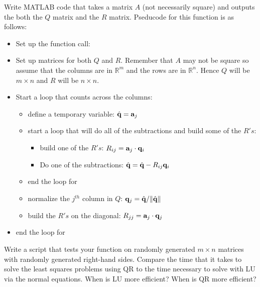\begin{problem}
    Write MATLAB code that takes a matrix $A$ (not necessarily square) and outputs the
    both the $Q$ matrix and the $R$ matrix. Pseducode for this function is as follows:
    \begin{itemize}
        \item Set up the function call:\\ 
        \item Set up  matrices for both $Q$ and $R$.  Remember that $A$ may
            not be square so assume that the columns are in $\mathbb{R}^m$ and the rows
            are in $\mathbb{R}^n$.  Hence $Q$ will be $m \times n$ and $R$ will be $n
            \times n$.
        \item Start a loop that counts across the columns:\\ 
            \begin{itemize}
                \item define a temporary variable: $\hat{{\bf q}} = {\bf a}_j$
                \item start a loop that will do all of the subtractions and build some of
                    the $R's$:\\ 
                    \begin{itemize}
                        \item build one of the $R's$: $R_{ij} = {\bf a}_j \cdot {\bf q}_i$
                        \item Do one of the subtractions: $\hat{{\bf q}} = \hat{{\bf q}} - R_{ij} {\bf q}_i$
                    \end{itemize}
                \item end the loop for 
                \item normalize the $j^{th}$ column in $Q$: ${\bf q}_j = \hat{{\bf q}} / \| \hat{{\bf q}} \|$
                \item build the $R's$ on the diagonal: $R_{jj} = {\bf a}_j \cdot {\bf q}_j$
            \end{itemize}
        \item end the loop for 
    \end{itemize}
\end{problem}

\begin{problem}
    Write a script that tests your  function on randomly generated $m×n$ matrices
    with randomly generated right-hand sides. Compare the time that it takes to solve the
    least squares problems using QR to the time necessary to solve with LU via the normal
    equations. When is LU more efficient? When is QR more efficient?
\end{problem}

